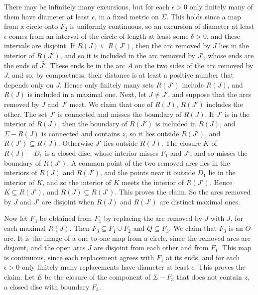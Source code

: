 {There may be infinitely many excursions, but for each $\epsilon > 0$ only finitely many of them have
diameter at least $\epsilon$, in a fixed metric on $\Sigma$. This holds since a map from a circle onto
$F_2$ is uniformly continuous, so an excursion of diameter at least $\epsilon$ comes from an interval
of the circle of length at least some $\delta > 0$, and these intervals are disjoint. If
$R(J) \subseteq R(J')$, then the arc removed by $J$ lies in the interior of $R(J')$, and so it is
included in the arc removed by $J'$, whose ends are the ends of $\bar{J'}$. These ends lie in the
arc $A$ on the two sides of the arc removed by $J$, and so, by compactness, their distance is at
least a positive number that depends only on $J$. Hence only finitely many sets $R(J')$ include
$R(J)$, and $R(J)$ is included in a maximal one. Next, let $J \ne J'$, and suppose that the arcs removed by
$J$ and $J'$ meet. We claim that one of $R(J)$, $R(J')$ includes the other. The set $J'$ is
connected and misses the boundary of $R(J)$. If $J'$ is in the interior of $R(J)$, then the
boundary of $R(J')$ is included in $R(J)$, and $\Sigma - R(J)$ is connected and contains $z$, so it
lies outside $R(J')$, and $R(J') \subseteq R(J)$. Otherwise $J'$ lies outside $R(J)$. The closure $K$
of $R(J) - D_1$ is a closed disc, whose interior misses $F_1$ and $\bar{J'}$, and so misses the
boundary of $R(J')$. A common point of the two removed arcs lies in the interiors of $R(J)$ and $R(J')$, and the points
near it outside $D_1$ lie in the interior of $K$, and so the interior of $K$ meets the interior of
$R(J')$. Hence $K \subseteq R(J')$, and $R(J) \subseteq R(J')$. This proves the claim.
So the arcs removed by $J$ and $J'$ are disjoint when $R(J)$ and $R(J')$ are distinct maximal
ones.

Now let $F_3$ be obtained from $F_1$ by replacing the arc removed by $J$ with $J$, for each maximal
$R(J)$. Then $F_3 \subseteq F_1 \cup F_2$ and $Q \subseteq F_3$. We claim that $F_3$ is an $O$-arc. It
is the image of a one-to-one map from a circle, since the removed arcs are disjoint, and the open
arcs $J$ are disjoint from each other and from $F_1$. This map is continuous, since each replacement
agrees with $F_1$ at its ends, and for each $\epsilon > 0$ only finitely many replacements have
diameter at least $\epsilon$. This proves the claim. Let $E$ be the closure of the component of
$\Sigma - F_3$ that does not contain $z$, a closed disc with boundary $F_3$.

}
